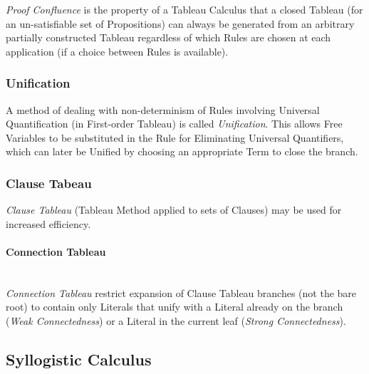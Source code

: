 \emph{Proof Confluence} is the property of a Tableau Calculus that a
closed Tableau (for an un-satisfiable set of Propositions) can always
be generated from an arbitrary partially constructed Tableau
regardless of which Rules are chosen at each application (if a choice
between Rules is available).



\subsubsection{Unification} \label{sec:tableau_unification}

A method of dealing with non-determinism of Rules involving Universal
Quantification (in First-order Tableau) is called \emph{Unification}.
This allows Free Variables to be substituted in the Rule for
Eliminating Universal Quantifiers, which can later be Unified by
choosing an appropriate Term to close the branch.



\subsubsection{Clause Tabeau} \label{sec:clause_tableau}

\emph{Clause Tableau} (Tableau Method applied to sets of Clauses) may
be used for increased efficiency.



\paragraph{Connection Tableau} \label{sec:connection_tableau}
\hfill \\

\emph{Connection Tableau} restrict expansion of Clause Tableau
branches (not the bare root) to contain only Literals that unify with
a Literal already on the branch (\emph{Weak Connectedness}) or a
Literal in the current leaf (\emph{Strong Connectedness}).



\subsection{Syllogistic Calculus} \label{sec:syllogistic_calculus}



